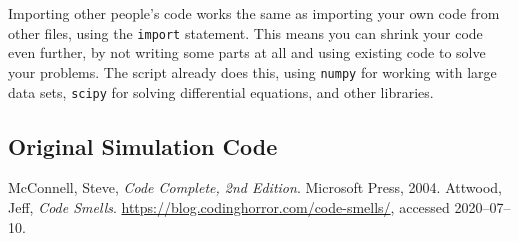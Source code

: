 \documentclass[a4paper]{article}
\begin{document}
Importing other people's code works the same as importing your own code from other files, using the \texttt{import} statement. This means you can shrink your code even further, by not writing some parts at all and using existing code to solve your problems. The script already does this, using \texttt{numpy} for working with large data sets, \texttt{scipy} for solving differential equations, and other libraries.

\begin{appendices}
\section{Original Simulation Code\label{code-appendix}}



\end{appendices}

\begin{thebibliography}{9}
   McConnell, Steve, \textit{Code Complete, 2nd Edition}. Microsoft Press, 2004.
   Attwood, Jeff, \textit{Code Smells}. \url{https://blog.codinghorror.com/code-smells/}, accessed 2020--07--10.
\end{thebibliography}
\end{document}
